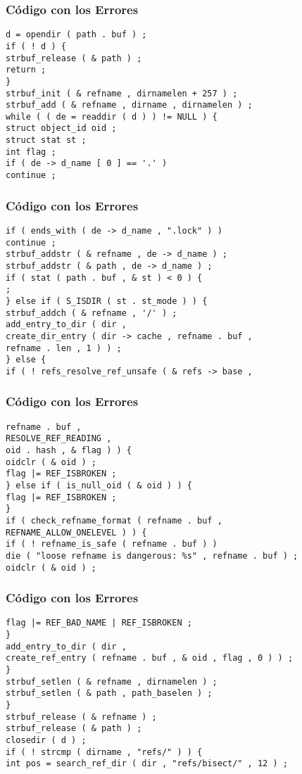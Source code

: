 \documentclass{beamer}
\begin{document}
\begin{frame}[fragile]
\frametitle{C\'odigo con los Errores}
\begin{verbatim}
d = opendir ( path . buf ) ; 
if ( ! d ) { 
strbuf_release ( & path ) ; 
return ; 
} 
strbuf_init ( & refname , dirnamelen + 257 ) ; 
strbuf_add ( & refname , dirname , dirnamelen ) ; 
while ( ( de = readdir ( d ) ) != NULL ) { 
struct object_id oid ; 
struct stat st ; 
int flag ; 
if ( de -> d_name [ 0 ] == '.' ) 
continue ; 
\end{verbatim}
\end{frame}
\begin{frame}[fragile]
\frametitle{C\'odigo con los Errores}
\begin{verbatim}
if ( ends_with ( de -> d_name , ".lock" ) ) 
continue ; 
strbuf_addstr ( & refname , de -> d_name ) ; 
strbuf_addstr ( & path , de -> d_name ) ; 
if ( stat ( path . buf , & st ) < 0 ) { 
; 
} else if ( S_ISDIR ( st . st_mode ) ) { 
strbuf_addch ( & refname , '/' ) ; 
add_entry_to_dir ( dir , 
create_dir_entry ( dir -> cache , refname . buf , 
refname . len , 1 ) ) ; 
} else { 
if ( ! refs_resolve_ref_unsafe ( & refs -> base , 
\end{verbatim}
\end{frame}
\begin{frame}[fragile]
\frametitle{C\'odigo con los Errores}
\begin{verbatim}
refname . buf , 
RESOLVE_REF_READING , 
oid . hash , & flag ) ) { 
oidclr ( & oid ) ; 
flag |= REF_ISBROKEN ; 
} else if ( is_null_oid ( & oid ) ) { 
flag |= REF_ISBROKEN ; 
} 
if ( check_refname_format ( refname . buf , 
REFNAME_ALLOW_ONELEVEL ) ) { 
if ( ! refname_is_safe ( refname . buf ) ) 
die ( "loose refname is dangerous: %s" , refname . buf ) ; 
oidclr ( & oid ) ; 
\end{verbatim}
\end{frame}
\begin{frame}[fragile]
\frametitle{C\'odigo con los Errores}
\begin{verbatim}
flag |= REF_BAD_NAME | REF_ISBROKEN ; 
} 
add_entry_to_dir ( dir , 
create_ref_entry ( refname . buf , & oid , flag , 0 ) ) ; 
} 
strbuf_setlen ( & refname , dirnamelen ) ; 
strbuf_setlen ( & path , path_baselen ) ; 
} 
strbuf_release ( & refname ) ; 
strbuf_release ( & path ) ; 
closedir ( d ) ; 
if ( ! strcmp ( dirname , "refs/" ) ) { 
int pos = search_ref_dir ( dir , "refs/bisect/" , 12 ) ; 
\end{verbatim}
\end{frame}
\end{document}

